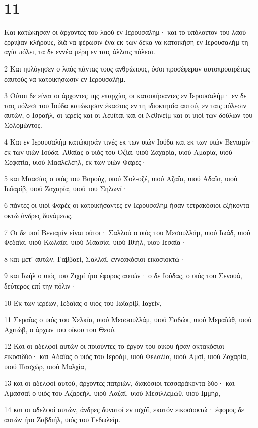 \chapter{11}

\par Και κατώκησαν οι άρχοντες του λαού εν Ιερουσαλήμ· και το υπόλοιπον του λαού έρριψαν κλήρους, διά να φέρωσιν ένα εκ των δέκα να κατοικήση εν Ιερουσαλήμ τη αγία πόλει, τα δε εννέα μέρη εν ταις άλλαις πόλεσι.
\par 2 Και ηυλόγησεν ο λαός πάντας τους ανθρώπους, όσοι προσέφεραν αυτοπροαιρέτως εαυτούς να κατοικήσωσιν εν Ιερουσαλήμ.
\par 3 Ούτοι δε είναι οι άρχοντες της επαρχίας οι κατοικήσαντες εν Ιερουσαλήμ· εν δε ταις πόλεσι του Ιούδα κατώκησαν έκαστος εν τη ιδιοκτησία αυτού, εν ταις πόλεσιν αυτών, ο Ισραήλ, οι ιερείς και οι Λευΐται και οι Νεθινείμ και οι υιοί των δούλων του Σολομώντος.
\par 4 Και εν Ιερουσαλήμ κατώκησάν τινές εκ των υιών Ιούδα και εκ των υιών Βενιαμίν· εκ των υιών Ιούδα, Αθαΐας ο υιός του Οζία, υιού Ζαχαρία, υιού Αμαρία, υιού Σεφατία, υιού Μααλελεήλ, εκ των υιών Φαρές·
\par 5 και Μαασίας ο υιός του Βαρούχ, υιού Χολ-οζέ, υιού Αζαΐα, υιού Αδαΐα, υιού Ιωϊαρίβ, υιού Ζαχαρία, υιού του Σηλωνί·
\par 6 πάντες οι υιοί Φαρές οι κατοικήσαντες εν Ιερουσαλήμ ήσαν τετρακόσιοι εξήκοντα οκτώ άνδρες δυνάμεως.
\par 7 Οι δε υιοί Βενιαμίν είναι ούτοι· Σαλλού ο υιός του Μεσουλλάμ, υιού Ιωάδ, υιού Φεδαΐα, υιού Κωλαΐα, υιού Μαασία, υιού Ιθιήλ, υιού Ιεσαΐα·
\par 8 και μετ' αυτών, Γαββαεί, Σαλλαΐ, εννεακόσιοι εικοσιοκτώ·
\par 9 και Ιωήλ ο υιός του Ζιχρί ήτο έφορος αυτών· ο δε Ιούδας, ο υιός του Σενουά, δεύτερος επί την πόλιν·
\par 10 Εκ των ιερέων, Ιεδαΐας ο υιός του Ιωϊαρίβ, Ιαχείν,
\par 11 Σεραΐας ο υιός του Χελκία, υιού Μεσσουλλάμ, υιού Σαδώκ, υιού Μεραϊώθ, υιού Αχιτώβ, ο άρχων του οίκου του Θεού.
\par 12 Και οι αδελφοί αυτών οι ποιούντες το έργον του οίκου ήσαν οκτακόσιοι εικοσιδύο· και Αδαΐας ο υιός του Ιεροάμ, υιού Φελαλία, υιού Αμσί, υιού Ζαχαρία, υιού Πασχώρ, υιού Μαλχία,
\par 13 και οι αδελφοί αυτού, άρχοντες πατριών, διακόσιοι τεσσαράκοντα δύο· και Αμασσαΐ ο υιός του Αζαρεήλ, υιού Ααζαΐ, υιού Μεσιλλεμώθ, υιού Ιμμήρ,
\par 14 και οι αδελφοί αυτών, άνδρες δυνατοί εν ισχύϊ, εκατόν εικοσιοκτώ· έφορος δε αυτών ήτο Ζαβδιήλ, υιός του Γεδωλείμ.
